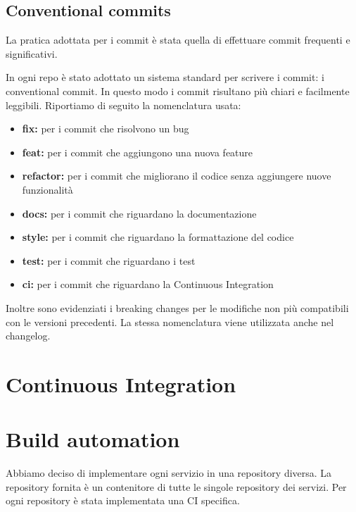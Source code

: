 \subsection{Conventional commits}
La pratica adottata per i commit è stata quella di effettuare commit frequenti e significativi.

In ogni repo è stato adottato un sistema standard per scrivere i commit:  i conventional commit. In questo modo i commit risultano più chiari e facilmente leggibili. 
Riportiamo di seguito la nomenclatura usata:
\begin{itemize}
    \item \textbf{fix:} per i commit che risolvono un bug
    \item \textbf{feat:} per i commit che aggiungono una nuova feature
    \item \textbf{refactor:} per i commit che migliorano il codice senza aggiungere nuove funzionalità
    \item \textbf{docs:} per i commit che riguardano la documentazione
    \item \textbf{style:} per i commit che riguardano la formattazione del codice
    \item \textbf{test:} per i commit che riguardano i test
    \item \textbf{ci:} per i commit che riguardano la Continuous Integration
\end{itemize}
Inoltre sono evidenziati i breaking changes per le modifiche non più compatibili con le versioni precedenti.
La stessa nomenclatura viene utilizzata anche nel changelog.

\section{Continuous Integration}
\section{Build automation}
Abbiamo deciso di implementare ogni servizio in una repository diversa. La repository fornita è un contenitore di tutte le singole repository dei servizi.
Per ogni repository è stata implementata una CI specifica. \\

